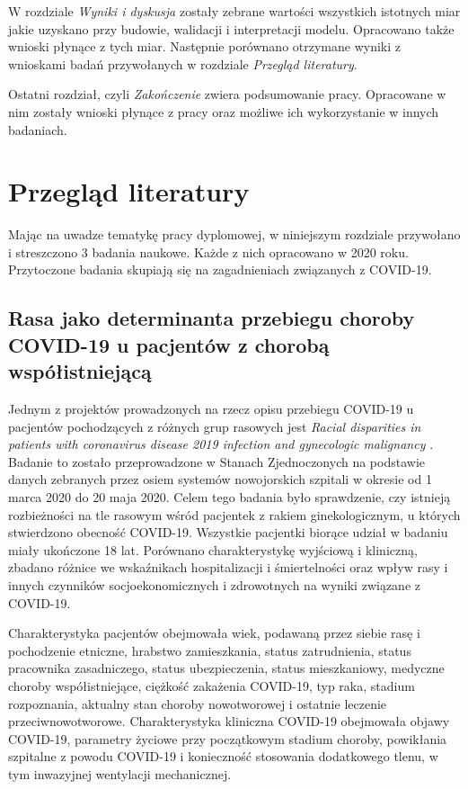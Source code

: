 \documentclass[polish, twoside, 12pt, a4paper]{article}
\theoremstyle{definition}
\theoremstyle{plain}
\theoremstyle{remark}
\begin{document}
W rozdziale \emph{Wyniki i dyskusja} zostały zebrane wartości wszystkich istotnych miar jakie uzyskano przy budowie, walidacji i interpretacji modelu. Opracowano także wnioski płynące z tych miar. Następnie porównano otrzymane wyniki z wnioskami badań przywołanych w rozdziale \emph{Przegląd literatury}.

Ostatni rozdział, czyli \emph{Zakończenie} zwiera podsumowanie pracy. Opracowane w nim zostały wnioski płynące z pracy oraz możliwe ich wykorzystanie w innych badaniach.


\cleardoublepage
\section{Przegląd literatury}
\label{chapter:przeglad-literatury}


Mając na uwadze tematykę pracy dyplomowej, w niniejszym rozdziale przywołano i streszczono 3 badania naukowe. Każde z nich opracowano w 2020 roku. Przytoczone badania skupiają się na zagadnieniach związanych z COVID-19.

\subsection{Rasa jako determinanta przebiegu choroby COVID-19 u pacjentów z chorobą współistniejącą}

Jednym z projektów prowadzonych na rzecz opisu przebiegu COVID-19 u pacjentów pochodzących z różnych grup rasowych jest \emph{Racial disparities in patients with coronavirus disease 2019 infection and gynecologic malignancy} \citep{borghesi2020}. Badanie to zostało przeprowadzone w Stanach Zjednoczonych na podstawie danych zebranych przez osiem systemów nowojorskich szpitali w okresie od 1 marca 2020 do 20 maja 2020. Celem tego badania było sprawdzenie, czy istnieją rozbieżności na tle rasowym wśród pacjentek z rakiem ginekologicznym, u których stwierdzono obecność COVID-19. Wszystkie pacjentki biorące udział w badaniu miały ukończone 18 lat. Porównano charakterystykę wyjściową i kliniczną, zbadano różnice we wskaźnikach hospitalizacji i śmiertelności oraz wpływ rasy i innych czynników socjoekonomicznych i zdrowotnych na wyniki związane z COVID-19. 

Charakterystyka pacjentów obejmowała wiek, podawaną przez siebie rasę i pochodzenie etniczne, hrabstwo zamieszkania, status zatrudnienia, status pracownika zasadniczego, status ubezpieczenia, status mieszkaniowy, medyczne choroby współistniejące, ciężkość zakażenia COVID-19, typ raka, stadium rozpoznania, aktualny stan choroby nowotworowej i ostatnie leczenie przeciwnowotworowe.  Charakterystyka kliniczna COVID-19 obejmowała objawy COVID-19, parametry życiowe przy początkowym stadium choroby, powikłania szpitalne z powodu COVID-19 i konieczność stosowania dodatkowego tlenu, w tym inwazyjnej wentylacji mechanicznej. 
\end{document}
